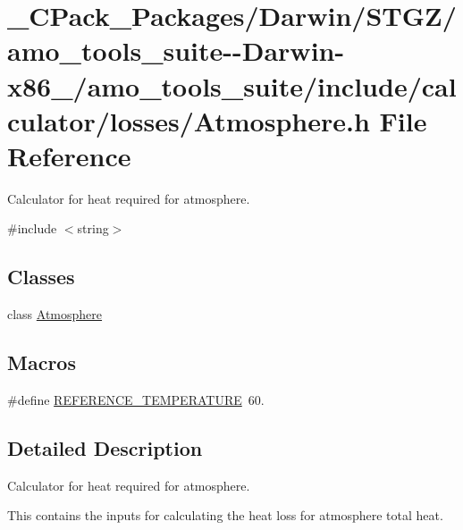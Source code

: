 \hypertarget{___c_pack___packages_2_darwin_2_s_t_g_z_2amo__tools__suite--_darwin-x86__64_2amo__tools__suite_2e55e6468306d671528be79ed436ba8db}{}\section{\+\_\+\+C\+Pack\+\_\+\+Packages/\+Darwin/\+S\+T\+G\+Z/amo\+\_\+tools\+\_\+suite-\/-\/\+Darwin-\/x86\+\_/amo\+\_\+tools\+\_\+suite/include/calculator/losses/\+Atmosphere.h File Reference}
\label{___c_pack___packages_2_darwin_2_s_t_g_z_2amo__tools__suite--_darwin-x86__64_2amo__tools__suite_2e55e6468306d671528be79ed436ba8db}


Calculator for heat required for atmosphere.  


{\ttfamily \#include $<$string$>$}\newline
\subsection*{Classes}
\begin{DoxyCompactItemize}
\item 
class \hyperlink{class_atmosphere}{Atmosphere}
\end{DoxyCompactItemize}
\subsection*{Macros}
\begin{DoxyCompactItemize}
\item 
\#define \hyperlink{___c_pack___packages_2_darwin_2_s_t_g_z_2amo__tools__suite--_darwin-x86__64_2amo__tools__suite_2e55e6468306d671528be79ed436ba8db_a4fb3326b931fe94b2ec5f8acfbdd56a8}{R\+E\+F\+E\+R\+E\+N\+C\+E\+\_\+\+T\+E\+M\+P\+E\+R\+A\+T\+U\+RE}~60.
\end{DoxyCompactItemize}


\subsection{Detailed Description}
Calculator for heat required for atmosphere. 

This contains the inputs for calculating the heat loss for atmosphere total heat.

